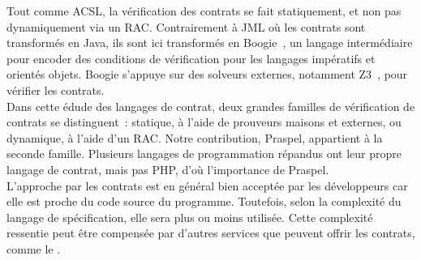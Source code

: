 Tout comme ACSL, la vérification des contrats se fait statiquement, et non pas
dynamiquement via un RAC. Contrairement à JML où les contrats sont transformés
en Java, ils sont ici transformés en Boogie~, un langage
intermédiaire pour encoder des conditions de vérification pour les langages
impératifs et orientés objets. Boogie s'appuye sur des solveurs externes,
notamment Z3~, pour vérifier les contrats. \\

Dans cette édude des langages de contrat, deux grandes familles de vérification
de contrats se distinguent~: statique, à l'aide de prouveurs maisons et
externes, ou dynamique, à l'aide d'un RAC. Notre contribution, Praspel,
appartient à la seconde famille. Plusieurs langages de programmation répandus
ont leur propre langage de contrat, mais pas PHP, d'où l'importance de Praspel.
\\

L'approche par les contrats est en général bien acceptée par les développeurs
car elle est proche du code source du programme. Toutefois, selon la complexité
du langage de spécification, elle sera plus ou moins utilisée. Cette complexité
ressentie peut être compensée par d'autres services que peuvent offrir les
contrats, comme le .
